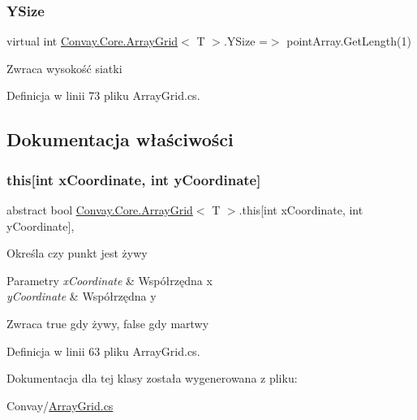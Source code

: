 \subsubsection{\texorpdfstring{Y\+Size}{YSize}}
{\footnotesize\ttfamily virtual int \hyperlink{class_convay_1_1_core_1_1_array_grid}{Convay.\+Core.\+Array\+Grid}$<$ T $>$.Y\+Size =$>$ point\+Array.\+Get\+Length(1)}



Zwraca wysokość siatki 



Definicja w linii 73 pliku Array\+Grid.\+cs.



\subsection{Dokumentacja właściwości}
\hypertarget{class_convay_1_1_core_1_1_array_grid_a5172309852f135d2cde364c609733000}{}\label{class_convay_1_1_core_1_1_array_grid_a5172309852f135d2cde364c609733000} 
\subsubsection{\texorpdfstring{this[int x\+Coordinate, int y\+Coordinate]}{this[int xCoordinate, int yCoordinate]}}
{\footnotesize\ttfamily abstract bool \hyperlink{class_convay_1_1_core_1_1_array_grid}{Convay.\+Core.\+Array\+Grid}$<$ T $>$.this\mbox{[}int x\+Coordinate, int y\+Coordinate\mbox{]}\hspace{0.3cm}{\ttfamily [get]}, {\ttfamily [set]}}



Określa czy punkt jest żywy 


\begin{DoxyParams}{Parametry}
{\em x\+Coordinate} & Współrzędna x\\
\hline
{\em y\+Coordinate} & Współrzędna y\\
\hline
\end{DoxyParams}
\begin{DoxyReturn}{Zwraca}
true gdy żywy, false gdy martwy
\end{DoxyReturn}


Definicja w linii 63 pliku Array\+Grid.\+cs.



Dokumentacja dla tej klasy została wygenerowana z pliku\+:\begin{DoxyCompactItemize}
\item 
Convay/\hyperlink{_array_grid_8cs}{Array\+Grid.\+cs}\end{DoxyCompactItemize}
